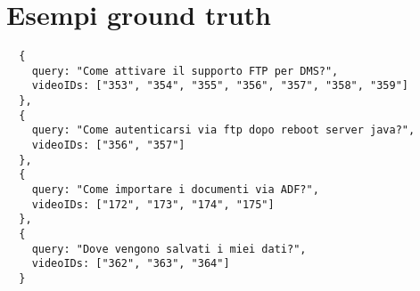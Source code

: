 \chapter{Esempi ground truth}
\label{cap:esempi-test}

\begin{verbatim}
  {
    query: "Come attivare il supporto FTP per DMS?",
    videoIDs: ["353", "354", "355", "356", "357", "358", "359"]
  },
  {
    query: "Come autenticarsi via ftp dopo reboot server java?",
    videoIDs: ["356", "357"]
  },
  {
    query: "Come importare i documenti via ADF?",
    videoIDs: ["172", "173", "174", "175"]
  },
  {
    query: "Dove vengono salvati i miei dati?",
    videoIDs: ["362", "363", "364"]
  }
\end{verbatim}